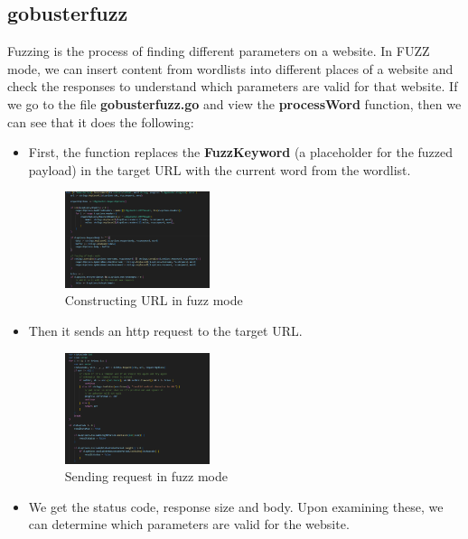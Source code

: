 \documentclass[12 pt]{article}
\begin{document}
\subsection{gobusterfuzz}
Fuzzing is the process of finding different parameters on a website.
In FUZZ mode, we can insert content from wordlists into different places of a website and check the responses to understand which parameters are valid for that website. If we go to the file \textbf{gobusterfuzz.go} and view the \textbf{processWord} function, then we can see that it does the following:
\begin{itemize}
    \item First, the function replaces the \textbf{FuzzKeyword} (a placeholder for the fuzzed payload) in the target URL with the current word from the wordlist.
    \begin{figure}[!htbp]
        \centering
        \includegraphics[width=0.4\textwidth]{Gobusterfuzz_Construct_Url.png}
        \caption{Constructing URL in fuzz mode}
        \label{fig: Gobusterfuzz Construct URL}
    \end{figure}
    \item Then it sends an http request to the target URL.
    \begin{figure}[!htbp]
        \centering
        \includegraphics[width=0.4\textwidth]{Gobusterfuzz_Send_Request.png}
        \caption{Sending request in fuzz mode}
        \label{fig: Gobusterfuzz Send Request}
    \end{figure}
    \item We get the status code, response size and body. Upon examining these, we can determine which parameters are valid for the website.
\end{itemize}
\end{document}
